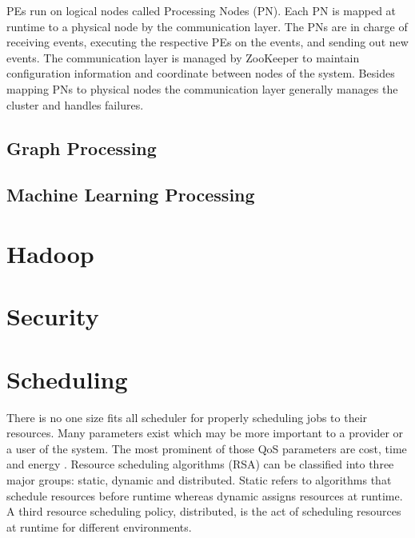 \documentclass[12pt]{article}
\begin{document}
PEs run on logical nodes called Processing Nodes (PN). Each PN is mapped at runtime to a physical node by the communication layer. The PNs are in charge of receiving events, executing the respective PEs on the events, and sending out new events. The communication layer is managed by ZooKeeper to maintain configuration information and coordinate between nodes of the system. Besides mapping PNs to physical nodes the communication layer generally manages the cluster and handles failures.



\subsection{Graph Processing}

\cite{zhang2016survey,low2012distributed,malewicz2010pregel}






\subsection{Machine Learning Processing}

\cite{zhang2016survey,xing2015petuum}



\section{Hadoop} \label{sec:hadoop}

\cite{zhang2016survey,polato2014hadoop,sakr2013hadoop}

\section{Security} \label{sec:security}

\cite{liu2015survey,kazim2015survey,kalpana2015brief}



\section{Scheduling} \label{sec:scheduling}

There is no one size fits all scheduler for properly scheduling jobs to their resources. Many parameters exist which may be more important to a provider or a user of the system. The most prominent of those QoS parameters are cost, time and energy \cite{Singh2016}. Resource scheduling algorithms (RSA) can be classified into three major groups: static, dynamic and distributed. Static refers to algorithms that schedule resources before runtime whereas dynamic assigns resources at runtime. A third resource scheduling policy, distributed, is the act of scheduling resources at runtime for different environments.
\end{document}
